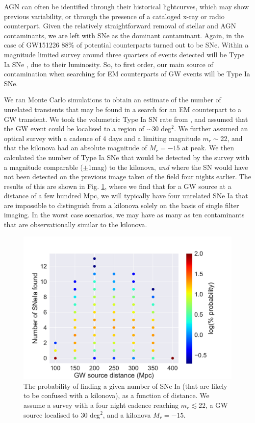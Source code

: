 \documentclass{aa}
\begin{document}
AGN can often be identified through their historical lightcurves, which may show previous variability, or through the presence of a cataloged x-ray or radio counterpart. Given the relatively straightforward removal of stellar and AGN contaminants, we are left with SNe as the dominant contaminant. Again, in the case of GW151226 88\% of potential counterparts turned out to be SNe. Within a magnitude limited survey around three quarters of events detected will be Type Ia SNe \citep{2011MNRAS.412.1441L}, due to their luminosity. So, to first order, our main source of contamination when searching for EM counterparts of GW events will be Type Ia SNe.

We ran Monte Carlo simulations to obtain an estimate of the number of unrelated transients that may be found in a search for an EM counterpart to a GW transient. We took the volumetric Type Ia SN rate from \cite{2010ApJ...713.1026D}, and assumed that the GW event could be localised to a region of $\sim$30 deg$^2$. We further assumed an optical survey with a cadence of 4 days and a limiting magnitude $m_r\sim$22, and that the kilonova had an absolute magnitude of $M_r=-15$ at peak. We then calculated the number of Type Ia SNe that would be detected by the survey with a magnitude comparable ($\pm1$mag) to the kilonova, {\it and} where the SN would have not been detected on the previous image taken of the field four nights earlier. The results of this are shown in Fig. \ref{fig:SNIa}, where we find that for a GW source at a distance of a few hundred Mpc, we will typically have four 
unrelated SNe Ia that are impossible to distinguish from a kilonova solely on the basis of single filter imaging. In the worst case scenarios, we may have as many as ten contaminants that are observationally similar to the kilonova.

\begin{figure}[h]
\includegraphics[width=\linewidth]{../Figs/SNIa_lim22mag}
\caption{The probability of finding a given number of SNe Ia (that are likely to be confused with a kilonova), as a function of distance. We assume a survey with a four night cadence reaching $m_r\lesssim$22, a GW source localised to 30 deg$^2$, and a kilonova  $M_r=-15$.}
\label{fig:SNIa}
\end{figure}
\end{document}
